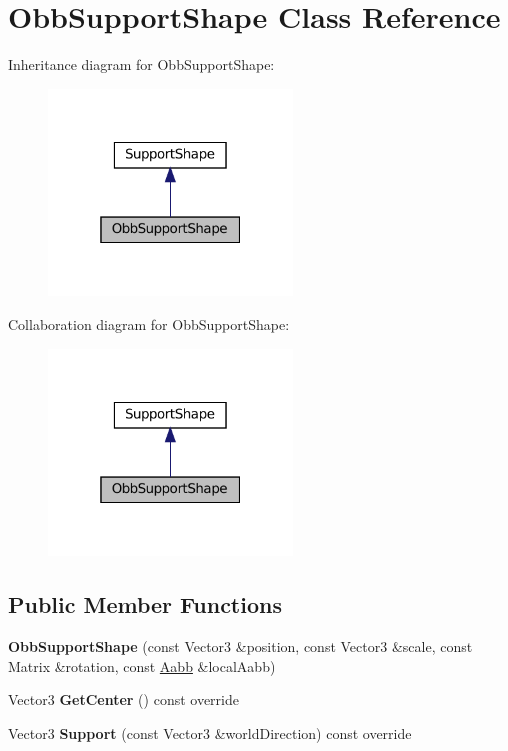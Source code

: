 \hypertarget{classObbSupportShape}{}\section{Obb\+Support\+Shape Class Reference}
\label{classObbSupportShape}


Inheritance diagram for Obb\+Support\+Shape\+:\nopagebreak
\begin{figure}[H]
\begin{center}
\leavevmode
\includegraphics[width=184pt]{classObbSupportShape__inherit__graph}
\end{center}
\end{figure}


Collaboration diagram for Obb\+Support\+Shape\+:\nopagebreak
\begin{figure}[H]
\begin{center}
\leavevmode
\includegraphics[width=184pt]{classObbSupportShape__coll__graph}
\end{center}
\end{figure}
\subsection*{Public Member Functions}
\begin{DoxyCompactItemize}
\item 
\mbox{\label{classObbSupportShape_a079d1b139368593624351a1a061a7d56}} 
{\bfseries Obb\+Support\+Shape} (const Vector3 \&position, const Vector3 \&scale, const Matrix \&rotation, const \hyperlink{classAabb}{Aabb} \&local\+Aabb)
\item 
\mbox{\label{classObbSupportShape_a0e18c90f510e3829d73e8b4478e68a81}} 
Vector3 {\bfseries Get\+Center} () const override
\item 
\mbox{\label{classObbSupportShape_ae47da1aea42eedb3327bc71aa08a0d65}} 
Vector3 {\bfseries Support} (const Vector3 \&world\+Direction) const override
\end{DoxyCompactItemize}
